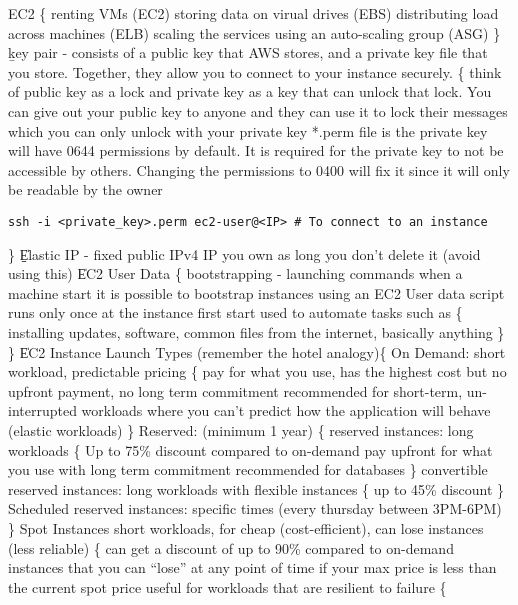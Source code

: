 EC2 \{
  \> renting VMs (EC2)
  \> storing data on virual drives (EBS)
  \> distributing load across machines (ELB)
  \> scaling the services using an auto-scaling group (ASG)
  \<
\}
\b{key pair} - consists of a public key that AWS stores, and a private key file
that you store. Together, they allow you to connect to your instance
securely. \{
  \> think of public key as a lock and private key as a key that can unlock
  that lock. You can give out your public key to anyone and they can use it
  to lock their messages which you can only unlock with your private key
  \> *.perm file is the private key will have 0644 permissions by default. It
  is required for the private key to not be accessible by others. Changing
  the permissions to 0400 will fix it since it will only be readable by the
  owner
  \> \begin{verbatim}ssh -i <private_key>.perm ec2-user@<IP> # To connect to an instance\end{verbatim}
\}
\|
\b{Elastic IP} - fixed public IPv4 IP you own as long you don't delete it (avoid using this) 
\|
EC2 User Data \{
  \> bootstrapping - launching commands when a machine start
  \> it is possible to bootstrap instances using an EC2 User data script
  \> runs only once at the instance first start
  \> used to automate tasks such as \{
    \> installing updates, software, common files from the internet, basically anything
  \}
\}
\|
EC2 Instance Launch Types (remember the hotel analogy)\{
  \> On Demand: short workload, predictable pricing \{
    \> pay for what you use, has the highest cost but no upfront payment, no long term commitment
    \> recommended for short-term, un-interrupted workloads where you can't predict how the application will behave (elastic workloads)
  \}
  \> Reserved: (minimum 1 year) \{
    \> reserved instances: long workloads \{
      \> Up to 75\% discount compared to on-demand
      \> pay upfront for what you use with long term commitment
      \> recommended for databases
    \}
    \> convertible reserved instances: long workloads with flexible instances \{
      \> up to 45\% discount
    \}
    \> Scheduled reserved instances: specific times (every thursday between 3PM-6PM)
  \}
  \> Spot Instances short workloads, for cheap (cost-efficient), can lose instances (less reliable) \{
    \> can get a discount of up to 90\% compared to on-demand
    \> instances that you can ``lose'' at any point of time if your max price is less than the current spot price
    \> useful for workloads that are resilient to failure \{
